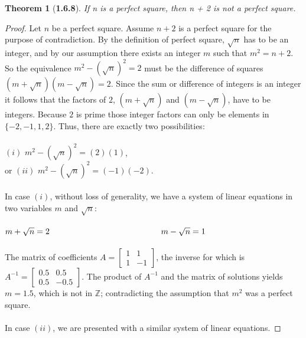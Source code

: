 \documentclass[a4paper, 12pt]{article}
\theoremstyle{plain}
\newtheorem*{theorem*}{Theorem}
\begin{document}
\begin{theorem*}[\textbf{1.6.8}]
    If n is a perfect square, then n + 2 is not a perfect square.
\end{theorem*}

\begin{proof}
    Let $n$ be a perfect square. Assume $n + 2$ is a perfect square for the purpose of 
    contradiction. By the definition of perfect square, $\sqrt{n}$ has to be an integer, and 
    by our assumption there exists an integer $m$ such that $m^2 = n + 2$. So the 
    equivalence $m^2 - (\sqrt{n})^2 = 2$ must be the difference of squares 
    $(m + \sqrt{n})(m - \sqrt{n}) = 2$. Since the sum or difference of integers is an integer 
    it follows that the factors of $2$, $(m + \sqrt{n})$ and $(m - \sqrt{n})$, have to be 
    integers. Because $2$ is prime those integer factors can only be elements in 
    $\{-2, -1, 1, 2\}$. Thus, there are exactly two possibilities:
    \\ \\ \indent \indent $(i)$ $m^2 - (\sqrt{n})^2 = (2)(1)$,
    \\ \indent \indent or $(ii)$ $m^2 - (\sqrt{n})^2 = (-1)(-2).$
    \\ \\ In case $(i)$, without loss of generality, we have 
    a system of linear 
    equations in two variables $m$ and $\sqrt{n}$: 
    \\ \\ \indent \indent \indent \indent \indent \indent \indent \indent \indent $m + \sqrt{n} = 2
    \\ \indent \indent \indent \indent \indent \indent \indent \indent \indent m - \sqrt{n} = 1$
    \\ \\
    The matrix of coefficients 
    $A = \left[\begin{smallmatrix}
        1 & 1 \\
        1 & -1 
    \end{smallmatrix}\right]$, the inverse for which is
    $A^{-1} = \left[\begin{smallmatrix}
        0.5 & 0.5 \\
        0.5 & -0.5
    \end{smallmatrix}\right]$. The product of $A^{-1}$ and the matrix of solutions
    yields $m = 1.5$, which is not in $\mathbb{Z}$;
    contradicting the assumption that $m^2$ was a perfect square.
    \\ \\ In case $(ii)$, we are presented with a similar system of linear equations.

\end{proof}
\end{document}
